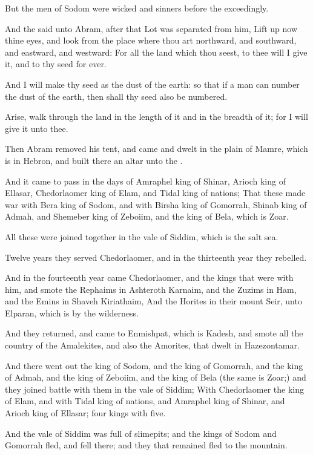 \Verse But the men of Sodom were wicked and sinners before the \LORD exceedingly.

\Verse And the \LORD said unto Abram, after that Lot was separated from him, Lift up now thine eyes, and look from the place where thou art northward, and southward, and eastward, and westward: \Verse For all the land which thou seest, to thee will I give it, and to thy seed for ever.

\Verse And I will make thy seed as the dust of the earth: so that if a man can number the dust of the earth, then shall thy seed also be numbered.

\Verse Arise, walk through the land in the length of it and in the breadth of it; for I will give it unto thee.

\Verse Then Abram removed his tent, and came and dwelt in the plain of Mamre, which is in Hebron, and built there an altar unto the \LORD.

\Chapter
\Verse And it came to pass in the days of Amraphel king of Shinar, Arioch king of Ellasar, Chedorlaomer king of Elam, and Tidal king of nations; \Verse That these made war with Bera king of Sodom, and with Birsha king of Gomorrah, Shinab king of Admah, and Shemeber king of Zeboiim, and the king of Bela, which is Zoar.

\Verse All these were joined together in the vale of Siddim, which is the salt sea.

\Verse Twelve years they served Chedorlaomer, and in the thirteenth year they rebelled.

\Verse And in the fourteenth year came Chedorlaomer, and the kings that were with him, and smote the Rephaims in Ashteroth Karnaim, and the Zuzims in Ham, and the Emins in Shaveh Kiriathaim, \Verse And the Horites in their mount Seir, unto Elparan, which is by the wilderness.

\Verse And they returned, and came to Enmishpat, which is Kadesh, and smote all the country of the Amalekites, and also the Amorites, that dwelt in Hazezontamar.

\Verse And there went out the king of Sodom, and the king of Gomorrah, and the king of Admah, and the king of Zeboiim, and the king of Bela (the same is Zoar;) and they joined battle with them in the vale of Siddim; \Verse With Chedorlaomer the king of Elam, and with Tidal king of nations, and Amraphel king of Shinar, and Arioch king of Ellasar; four kings with five.

\Verse And the vale of Siddim was full of slimepits; and the kings of Sodom and Gomorrah fled, and fell there; and they that remained fled to the mountain.

